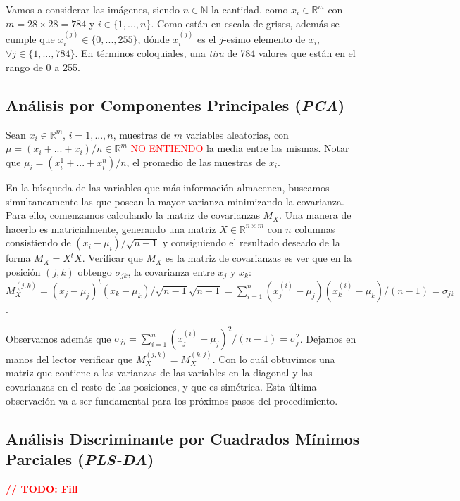 Vamos a considerar las im\'agenes, siendo $n \in \mathbb{N}$ la cantidad, como $x_{i} \in \mathbb{R}^{m}$ con $m = 28 \times 28 = 784$ y $i \in \{1, ..., n\}$. Como est\'an en escala de grises, adem\'as se cumple que $x_{i}^{(j)} \in \{0, ..., 255\}$, d\'onde $x_{i}^{(j)}$ es el $j$-esimo elemento de $x_{i}$, $\forall j \in \{1, ..., 784\}$. En t\'erminos coloquiales, una \textit{tira} de 784 valores que est\'an en el rango de 0 a 255.

\subsection{An\'alisis por Componentes Principales (\textit{PCA})}

Sean $x_{i} \in \mathbb{R}^{m}$, $i = 1, ..., n$, muestras de $m$ variables aleatorias, con $\mu = (x_{i} + ... + x_{i}) / n \in \mathbb{R}^{m}$ \textcolor{red}{NO ENTIENDO} la media entre las mismas. Notar que $\mu_{i} = (x_{i}^{1} + ... + x_{i}^{n}) / n$, el promedio de las muestras de $x_{i}$.

En la b\'usqueda de las variables que m\'as informaci\'on almacenen, buscamos simultaneamente las que posean la mayor varianza minimizando la covarianza. Para ello, comenzamos calculando la matriz de covarianzas $M_{X}$. Una manera de hacerlo es matricialmente, generando una matriz $X \in \mathbb{R}^{n \times m}$ con $n$ columnas consistiendo de $(x_{i} - \mu_{i}) / \sqrt{n - 1}$ y consiguiendo el resultado deseado de la forma $M_{X} = X^{t}X$. Verificar que $M_{X}$ es la matriz de covarianzas es ver que en la posici\'on $(j, k)$ obtengo $\sigma_{jk}$, la covarianza entre $x_{j}$ y $x_{k}$: \\

$M_{X}^{(j,k)} = (x_{j} - \mu_{j})^t(x_{k} - \mu_{k}) / \sqrt{n - 1}\sqrt{n - 1} = \sum\limits_{i = 1}^{n}(x_{j}^{(i)} - \mu_{j})(x_{k}^{(i)} - \mu_{k}) / (n - 1) = \sigma_{jk}$.

Observamos adem\'as que $\sigma_{jj} = \sum\limits_{i = 1}^{n}(x_{j}^{(i)} - \mu_{j})^{2} / (n - 1) = \sigma_{j}^{2}$. Dejamos en manos del lector verificar que $M_{X}^{(j,k)} = M_{X}^{(k,j)}$. Con lo cu\'al obtuvimos una matriz que contiene a las varianzas de las variables en la diagonal y las covarianzas en el resto de las posiciones, y que es sim\'etrica. Esta \'ultima observaci\'on va a ser fundamental para los pr\'oximos pasos del procedimiento.

\subsection{An\'alisis Discriminante por Cuadrados M\'inimos Parciales (\textit{PLS-DA})}

\textbf{\textcolor{red}{// TODO: Fill}}